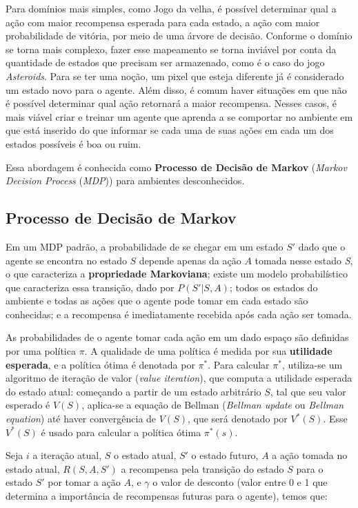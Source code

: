 Para domínios mais simples, como Jogo da velha, é possível determinar qual a ação com maior recompensa esperada para cada estado, a ação com maior probabilidade de vitória, por meio de uma árvore de decisão.
Conforme o domínio se torna mais complexo, fazer esse mapeamento se torna inviável por conta da quantidade de estados que precisam ser armazenado, como é o caso do jogo \textit{Asteroids}. Para se ter uma noção, um pixel que esteja diferente já é considerado um estado novo para o agente. Além disso, é comum haver situações em que não é possível determinar qual ação retornará a maior recompensa.
Nesses casos, é mais viável criar e treinar um agente que aprenda a se comportar no ambiente em que está inserido do que informar se cada uma de suas ações em cada um dos estados possíveis é boa ou ruim.

Essa abordagem é conhecida como \textbf{Processo de Decisão de Markov} (\textit{Markov Decision Process} (\textit{MDP})) para ambientes desconhecidos.

\subsection{Processo de Decisão de Markov}
\label{sec:mdp}

Em um MDP padrão, a probabilidade de se chegar em um estado $S'$ dado que o agente se encontra no estado $S$ depende apenas da ação $A$ tomada nesse estado \textit{S}, o que caracteriza a \textbf{propriedade Markoviana}; existe um modelo probabilístico que caracteriza essa transição, dado por $P(S'|S,A)$; todos os estados do ambiente e todas as ações que o agente pode tomar em cada estado são conhecidas; e a recompensa é imediatamente recebida após cada ação ser tomada.

As probabilidades de o agente tomar cada ação em um dado espaço são definidas por uma política $\pi$. A qualidade de uma política é medida por sua \textbf{utilidade esperada}, e a política ótima é denotada por $\pi^{*}$. Para calcular $\pi^{*}$, utiliza-se um algoritmo de iteração de valor (\textit{value iteration}), que computa a utilidade esperada do estado atual: começando a partir de um estado arbitrário $S$, tal que seu valor esperado é $V(S)$, aplica-se a equação de Bellman (\textit{Bellman update} ou \textit{Bellman equation}) até haver convergência de $V(S)$, que será denotado por $V^{*}(S)$. Esse $V^{*}(S)$ é usado para calcular a política ótima $\pi^{*}(s)$.

Seja $i$ a iteração atual, $S$ o estado atual, $S'$ o estado futuro, $A$ a ação tomada no estado atual, $R(S,A,S')$ a recompensa pela transição do estado $S$ para o estado $S'$ por tomar a ação $A$, e $\gamma$ o valor de desconto (valor entre 0 e 1 que determina a importância de recompensas futuras para o agente), temos que:

